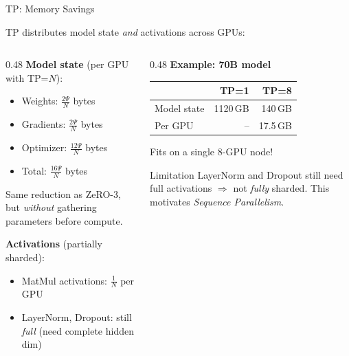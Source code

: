 \begin{frame}{TP: Memory Savings}

  TP distributes model state \emph{and} activations across GPUs:

  \vspace{0.3em}
  \begin{columns}
    \begin{column}{0.48\textwidth}
      \textbf{Model state} (per GPU with TP=$N$):
      \begin{itemize}
        \item Weights: $\frac{2\Psi}{N}$ bytes
        \item Gradients: $\frac{2\Psi}{N}$ bytes
        \item Optimizer: $\frac{12\Psi}{N}$ bytes
        \item Total: $\frac{16\Psi}{N}$ bytes
      \end{itemize}
      Same reduction as ZeRO-3, but \emph{without} gathering parameters before compute.

      \vspace{0.3em}
      \textbf{Activations} (partially sharded):
      \begin{itemize}
        \item MatMul activations: $\frac{1}{N}$ per GPU
        \item LayerNorm, Dropout: still \emph{full} (need complete hidden dim)
      \end{itemize}
    \end{column}
    \begin{column}{0.48\textwidth}
      \textbf{Example: 70B model}\\[0.3em]
      {\small
      \begin{tabular}{l r r}
        \toprule
        & TP=1 & TP=8 \\
        \midrule
        Model state & 1120\,GB & 140\,GB \\
        Per GPU     & -- & 17.5\,GB \\
        \bottomrule
      \end{tabular}
      }

      \vspace{0.5em}
      Fits on a single 8-GPU node!

      \vspace{0.3em}
      \begin{alertblock}{Limitation}
        LayerNorm and Dropout still need full activations $\Rightarrow$ not \emph{fully} sharded. This motivates \emph{Sequence Parallelism}.
      \end{alertblock}
    \end{column}
  \end{columns}
\end{frame}

